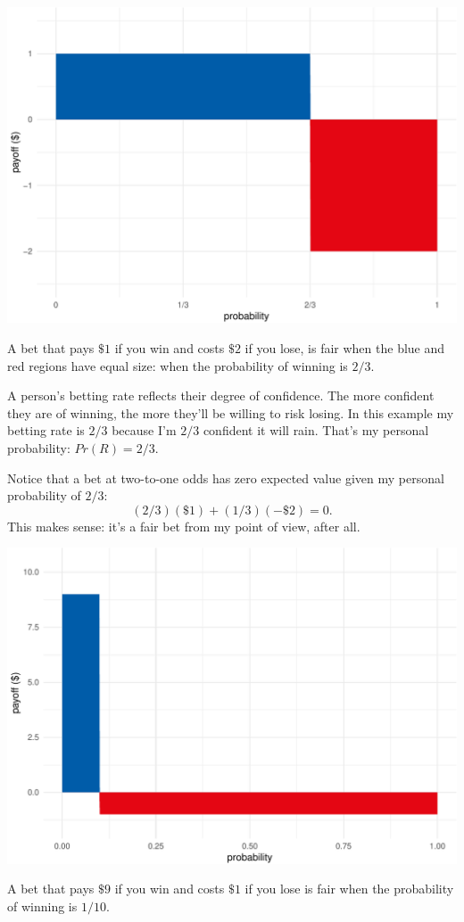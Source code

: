 \documentclass[justified]{tufte-book}
\newcommand{\p}{Pr}
\theoremstyle{definition}
\theoremstyle{definition}
\theoremstyle{definition}
\theoremstyle{remark}
\begin{document}
\begin{marginfigure}
\includegraphics{_main_files/figure-latex/unnamed-chunk-124-1} \caption[A bet that pays $\$1$ if you win and costs $\$2$ if you lose, is fair when the blue and red regions have equal size]{A bet that pays $\$1$ if you win and costs $\$2$ if you lose, is fair when the blue and red regions have equal size: when the probability of winning is $2/3$.}\label{fig:unnamed-chunk-124}
\end{marginfigure}

A person's betting rate reflects their degree of confidence. The more confident they are of winning, the more they'll be willing to risk losing. In this example my betting rate is \(2/3\) because I'm \(2/3\) confident it will rain. That's my personal probability: \(\p(R) = 2/3\).

Notice that a bet at two-to-one odds has zero expected value given my personal probability of \(2/3\):
\[ (2/3)(\$1) + (1/3)(-\$2) = 0. \]
This makes sense: it's a fair bet from my point of view, after all.

\begin{marginfigure}
\includegraphics{_main_files/figure-latex/unnamed-chunk-125-1} \caption[A bet that pays $\$9$ if you win and costs $\$1$ if you lose is fair when the probability of winning is $1/10$]{A bet that pays $\$9$ if you win and costs $\$1$ if you lose is fair when the probability of winning is $1/10$.}\label{fig:unnamed-chunk-125}
\end{marginfigure}
\end{document}
